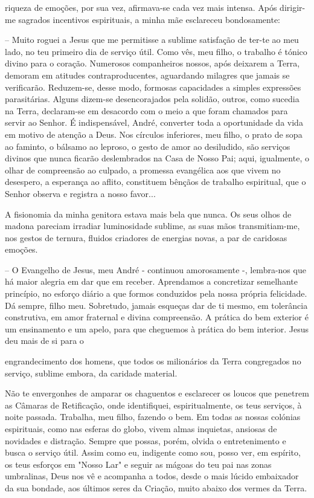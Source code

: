 \documentclass[portuguese,12pt,a4paper]{scrbook}
\begin{document}
	
	riqueza de emoções, por sua vez, afirmava-se cada vez mais intensa. Após dirigir-me sagrados incentivos espirituais, a minha mãe esclareceu bondosamente:
	
	– Muito roguei a Jesus que me permitisse a sublime satisfação de ter-te ao meu lado, no teu primeiro dia de serviço útil. Como vês, meu filho, o trabalho é tónico divino para o coração. Numerosos companheiros nossos, após deixarem a Terra, demoram em atitudes contraproducentes, aguardando milagres que jamais se verificarão. Reduzem-se, desse modo, formosas capacidades a simples expressões parasitárias. Alguns dizem-se desencorajados pela solidão, outros, como sucedia na Terra, declaram-se em desacordo com o meio a que foram chamados para servir ao Senhor. É indispensável, André, converter toda a oportunidade da vida em motivo de atenção a Deus. Nos círculos inferiores, meu filho, o prato de sopa ao faminto, o bálsamo ao leproso, o gesto de amor ao desiludido, são serviços divinos que nunca ficarão deslembrados na Casa de Nosso Pai; aqui, igualmente, o olhar de compreensão ao culpado, a promessa evangélica aos que vivem no desespero, a esperança ao aflito, constituem bênçãos de trabalho espiritual, que o Senhor observa e registra a nosso favor...
	
	A fisionomia da minha genitora estava mais bela que nunca. Os seus olhos de madona pareciam irradiar luminosidade sublime, as suas mãos transmitiam-me, nos gestos de ternura, fluidos criadores de energias novas, a par de caridosas emoções.
	
	– O Evangelho de Jesus, meu André - continuou amorosamente -, lembra-nos que há maior alegria em dar que em receber. Aprendamos a concretizar semelhante princípio, no esforço diário a que formos conduzidos pela nossa própria felicidade. Dá sempre, filho meu. Sobretudo, jamais esqueças dar de ti mesmo, em tolerância construtiva, em amor fraternal e divina compreensão. A prática do bem exterior é um ensinamento e um apelo, para que cheguemos à prática do bem interior. Jesus deu mais de si para o
	
	
	engrandecimento dos homens, que todos os milionários da Terra congregados no serviço, sublime embora, da caridade material.
	
	Não te envergonhes de amparar os chaguentos e esclarecer os loucos que penetrem as Câmaras de Retificação, onde identifiquei, espiritualmente, os teus serviços, à noite passada. Trabalha, meu filho, fazendo o bem. Em todas as nossas colónias espirituais, como nas esferas do globo, vivem almas inquietas, ansiosas de novidades e distração. Sempre que possas, porém, olvida o entretenimento e busca o serviço útil. Assim como eu, indigente como sou, posso ver, em espírito, os teus esforços em "Nosso Lar" e seguir as mágoas do teu pai nas zonas umbralinas, Deus nos vê e acompanha a todos, desde o mais lúcido embaixador da sua bondade, aos últimos seres da Criação, muito abaixo dos vermes da Terra.
	
\end{document}
